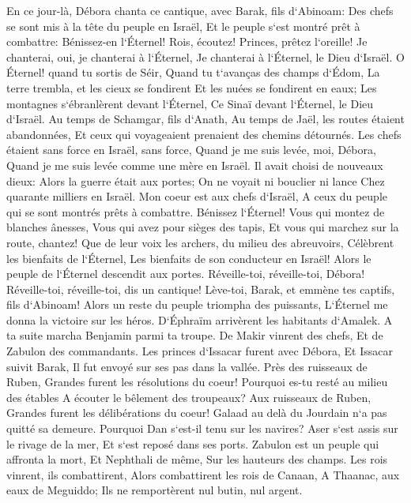 \verse En ce jour-là, Débora chanta ce cantique, avec Barak, fils d`Abinoam: 
\verse Des chefs se sont mis à la tête du peuple en Israël, Et le peuple s`est montré prêt à combattre: Bénissez-en l`Éternel! 
\verse Rois, écoutez! Princes, prêtez l`oreille! Je chanterai, oui, je chanterai à l`Éternel, Je chanterai à l`Éternel, le Dieu d`Israël. 
\verse O Éternel! quand tu sortis de Séir, Quand tu t`avanças des champs d`Édom, La terre trembla, et les cieux se fondirent Et les nuées se fondirent en eaux; 
\verse Les montagnes s`ébranlèrent devant l`Éternel, Ce Sinaï devant l`Éternel, le Dieu d`Israël. 
\verse Au temps de Schamgar, fils d`Anath, Au temps de Jaël, les routes étaient abandonnées, Et ceux qui voyageaient prenaient des chemins détournés. 
\verse Les chefs étaient sans force en Israël, sans force, Quand je me suis levée, moi, Débora, Quand je me suis levée comme une mère en Israël. 
\verse Il avait choisi de nouveaux dieux: Alors la guerre était aux portes; On ne voyait ni bouclier ni lance Chez quarante milliers en Israël. 
\verse Mon coeur est aux chefs d`Israël, A ceux du peuple qui se sont montrés prêts à combattre. Bénissez l`Éternel! 
\verse Vous qui montez de blanches ânesses, Vous qui avez pour sièges des tapis, Et vous qui marchez sur la route, chantez! 
\verse Que de leur voix les archers, du milieu des abreuvoirs, Célèbrent les bienfaits de l`Éternel, Les bienfaits de son conducteur en Israël! Alors le peuple de l`Éternel descendit aux portes. 
\verse Réveille-toi, réveille-toi, Débora! Réveille-toi, réveille-toi, dis un cantique! Lève-toi, Barak, et emmène tes captifs, fils d`Abinoam! 
\verse Alors un reste du peuple triompha des puissants, L`Éternel me donna la victoire sur les héros. 
\verse D`Éphraïm arrivèrent les habitants d`Amalek. A ta suite marcha Benjamin parmi ta troupe. De Makir vinrent des chefs, Et de Zabulon des commandants. 
\verse Les princes d`Issacar furent avec Débora, Et Issacar suivit Barak, Il fut envoyé sur ses pas dans la vallée. Près des ruisseaux de Ruben, Grandes furent les résolutions du coeur! 
\verse Pourquoi es-tu resté au milieu des étables A écouter le bêlement des troupeaux? Aux ruisseaux de Ruben, Grandes furent les délibérations du coeur! 
\verse Galaad au delà du Jourdain n`a pas quitté sa demeure. Pourquoi Dan s`est-il tenu sur les navires? Aser s`est assis sur le rivage de la mer, Et s`est reposé dans ses ports. 
\verse Zabulon est un peuple qui affronta la mort, Et Nephthali de même, Sur les hauteurs des champs. 
\verse Les rois vinrent, ils combattirent, Alors combattirent les rois de Canaan, A Thaanac, aux eaux de Meguiddo; Ils ne remportèrent nul butin, nul argent. 
